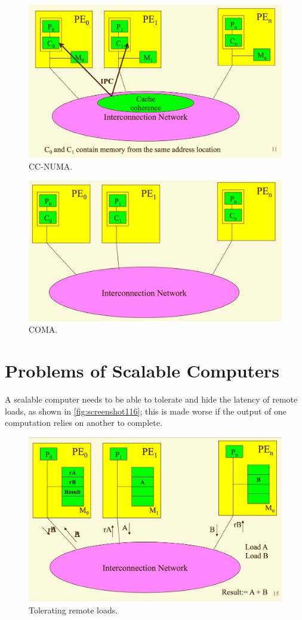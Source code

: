 \begin{figure}
\centering
\includegraphics[width=0.7\linewidth]{figures/screenshot113}
\caption{CC-NUMA.}
\label{fig:screenshot113}
\end{figure}

\begin{figure}
\centering
\includegraphics[width=0.7\linewidth]{figures/screenshot114}
\caption{COMA.}
\label{fig:screenshot114}
\end{figure}

\section{Problems of Scalable Computers}
A scalable computer needs to be able to tolerate and hide the latency of remote loads, as shown in \autoref{fig:screenshot116}; this is made worse if the output of one computation relies on another to complete.

\begin{figure}
\centering
\includegraphics[width=0.7\linewidth]{figures/screenshot116}
\caption{Tolerating remote loads.}
\label{fig:screenshot116}
\end{figure}

